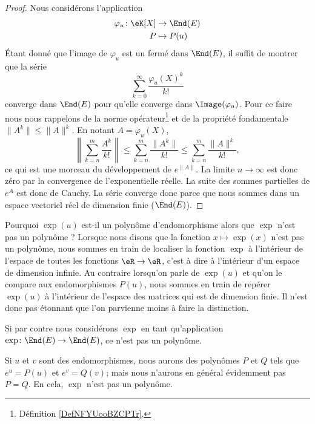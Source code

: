 \begin{proof}
    Nous considérons l'application
    \begin{equation}
        \begin{aligned}
            \varphi_u\colon \eK[X]&\to \End(E) \\
            P&\mapsto P(u)
        \end{aligned}
    \end{equation}
    Étant donné que l'image de \( \varphi_u\) est un fermé dans \( \End(E)\), il suffit de montrer que la série
    \begin{equation}
        \sum_{k=0}^{\infty}\frac{ \varphi_u(X)^k }{ k! }
    \end{equation}
    converge dans \( \End(E)\) pour qu'elle converge dans \( \Image(\varphi_u)\). Pour ce faire nous nous rappelons de la norme opérateur\footnote{Définition \ref{DefNFYUooBZCPTr}.} et de la propriété fondamentale \( \| A^k \|\leq \| A \|^k\). En notant \( A=\varphi_u(X)\),
    \begin{equation}
        \left\| \sum_{k=n}^m\frac{ A^k }{ k! } \right\|\leq \sum_{k=n}^m\frac{ \| A^k \| }{ k! }\leq \sum_{k=n}^m\frac{ \| A \|^k }{ k! },
    \end{equation}
    ce qui est une morceau du développement de \(  e^{\| A \|}\). La limite \( n\to\infty\) est donc zéro par la convergence de l'exponentielle réelle. La suite des sommes partielles de  $e^{A}$ est donc de Cauchy. La série converge donc parce que nous sommes dans un espace vectoriel réel de dimension finie (\( \End(E)\)).
\end{proof}

\begin{remark}
    Pourquoi \( \exp(u)\) est-il un polynôme d'endomorphisme alors que \( \exp\) n'est pas un polynôme ? Lorsque nous disons que la fonction \( x\mapsto \exp(x)\) n'est pas un polynôme, nous sommes en train de localiser la fonction \( \exp\) à l'intérieur de l'espace de toutes les fonctions \( \eR\to \eR\), c'est à dire à l'intérieur d'un espace de dimension infinie. Au contraire lorsqu'on parle de \( \exp(u)\) et qu'on le compare aux endomorphismes \( P(u)\), nous sommes en train de repérer \( \exp(u)\) à l'intérieur de l'espace des matrices qui est de dimension finie. Il n'est donc pas étonnant que l'on parvienne moins à faire la distinction.

    Si par contre nous considérons \( \exp\) en tant qu'application \( \exp\colon \End(E)\to \End(E)\), ce n'est pas un polynôme.

    Si \( u\) et \( v\) sont des endomorphismes, nous aurons des polynômes \( P\) et \( Q\) tels que \( e^u=P(u)\) et \( e^v=Q(v)\); mais nous n'aurons en général évidemment pas \( P=Q\). En cela, \( \exp\) n'est pas un polynôme.
\end{remark}
